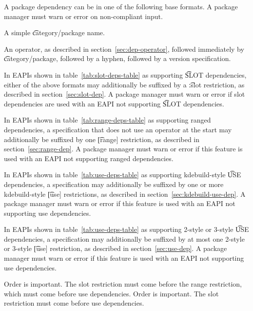 A package dependency can be in one of the following base formats. A package manager must warn or
error on non-compliant input.

\begin{compactitem}
\item A simple \t{category/package} name.
\item An operator, as described in section~\ref{sec:dep-operator}, followed immediately by
    \t{category/package}, followed by a hyphen, followed by a version specification.
\end{compactitem}

In EAPIs shown in table~\ref{tab:slot-deps-table} as supporting \t{SLOT} dependencies, either of the
above formats may additionally be suffixed by a \t{:slot} restriction, as described in
section~\ref{sec:slot-dep}. A package manager must warn or error if slot dependencies are used with an
EAPI not supporting \t{SLOT} dependencies.

\IFKDEBUILDELSE
{
    In EAPIs shown in table~\ref{tab:range-deps-table} as supporting ranged dependencies, a
    specification that does not use an operator at the start may additionally be suffixed by one
    \t{[range]} restriction, as described in section~\ref{sec:range-dep}. A package manager must warn or
    error if this feature is used with an EAPI not supporting ranged dependencies.
}{
}

\IFKDEBUILDELSE
{
    In EAPIs shown in table~\ref{tab:use-deps-table} as supporting kdebuild-style \t{USE} dependencies,
    a specification may additionally be suffixed by one or more kdebuild-style \t{[use]}
    restrictions, as described in section~\ref{sec:kdebuild-use-dep}. A package manager must warn or
    error if this feature is used with an EAPI not supporting use dependencies.
}{
}

In EAPIs shown in table~\ref{tab:use-deps-table} as supporting 2-style or 3-style \t{USE}
dependencies, a specification may additionally be suffixed by at most one 2-style or 3-style
\t{[use]} restriction, as described in section~\ref{sec:use-dep}. A package manager must warn or
error if this feature is used with an EAPI not supporting use dependencies.

\IFKDEBUILDELSE
{
    \note Order is important. The slot restriction must come before the range restriction, which
    must come before use dependencies.
}{
    \note Order is important. The slot restriction must come before use dependencies.
}

